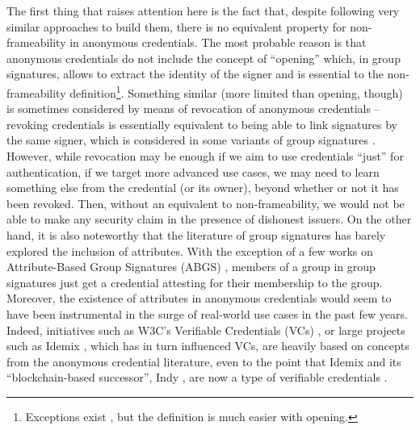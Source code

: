 The first thing that raises attention here is the fact that, despite following
very similar approaches to build them, there is no equivalent property for
non-frameability in anonymous credentials. The most probable reason is that
anonymous credentials do not include the concept of ``opening'' which, in
group signatures, allows to extract the identity of the signer and is essential
to the non-frameability definition\footnote{Exceptions exist \cite{dl21}, but
  the definition is much easier with opening.}. Something similar (more limited
than opening, though) is sometimes considered by means of revocation of
anonymous credentials -- revoking credentials is essentially equivalent to
being able to link signatures by the same signer, which is considered in some
variants of group signatures \needcite. However, while revocation may be enough
if we aim to use credentials ``just'' for authentication, if we target more
advanced use cases, we may need to learn something else from the credential (or
its owner), beyond whether or not it has been revoked. Then, without an
equivalent to non-frameability, we would not be able to make any security claim
in the presence of dishonest issuers. On the other hand, it is
also noteworthy that the literature of group signatures has barely explored
the inclusion of attributes. With the exception of a few works on Attribute-Based
Group Signatures (ABGS) \needcite, members of a group in group signatures just
get a credential attesting for their membership to the group. Moreover, the
existence of attributes in anonymous credentials would seem to have been
instrumental in the surge of real-world use cases in the past few years. Indeed,
initiatives such as W3C's Verifiable Credentials (VCs) \needcite, or large
projects such as Idemix \needcite, which has in turn influenced VCs, are heavily
based on concepts from the anonymous credential literature, even to the point
that Idemix and its ``blockchain-based successor'', Indy \needcite, are now a
type of verifiable credentials \needcite.

